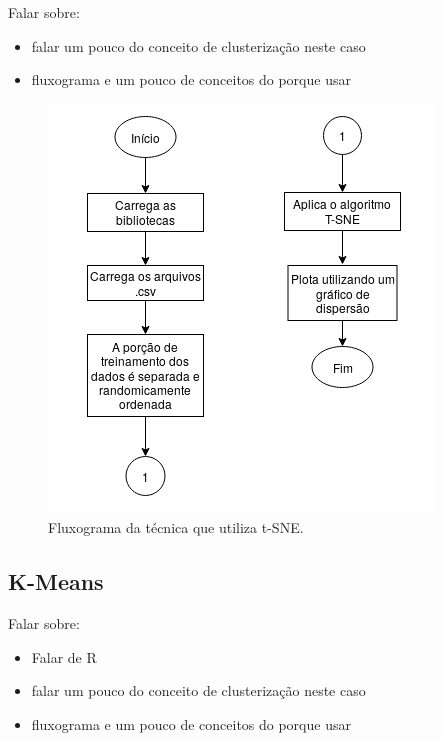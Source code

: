Falar sobre: 
\begin{itemize}
    \item falar um pouco do conceito de clusterização neste caso
    \item fluxograma e um pouco de conceitos do porque usar
\end{itemize}

\begin{figure}[H]
    \caption{Fluxograma da técnica que utiliza t-SNE.}
    \begin{center}
        \includegraphics[scale=.65]{metodologia/img/t-sne.png}
    \end{center}
    \label{fig:}
\end{figure}

%  

\subsection{K-Means}

Falar sobre: 
\begin{itemize}
    \item Falar de R
    \item falar um pouco do conceito de clusterização neste caso
    \item fluxograma e um pouco de conceitos do porque usar
\end{itemize}

